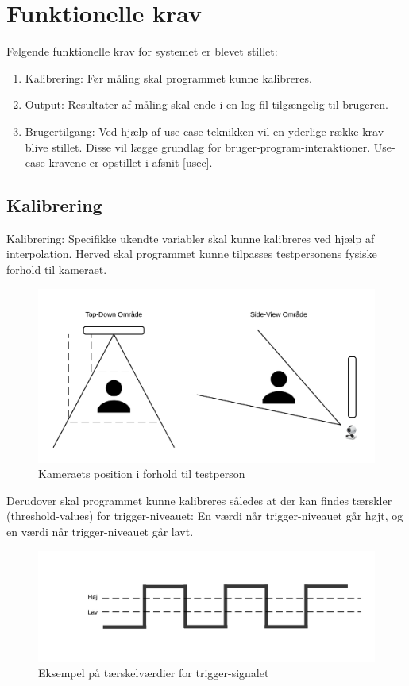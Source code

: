 \documentclass[kravspec.tex]{subfiles}
\begin{document}
\section{Funktionelle krav}
Følgende funktionelle krav for systemet er blevet stillet: \\
\begin{enumerate}
	\item 
	Kalibrering: Før måling skal programmet kunne kalibreres.
	\item
	Output: Resultater af måling skal ende i en log-fil tilgængelig til brugeren.
	\item
	Brugertilgang: Ved hjælp af use case teknikken vil en yderlige række krav blive stillet. Disse vil lægge grundlag for bruger-program-interaktioner. Use-case-kravene er opstillet i afsnit \ref{usec}.  
\end{enumerate}

\subsection{Kalibrering}
Kalibrering: Specifikke ukendte variabler skal kunne kalibreres ved hjælp af interpolation. Herved skal programmet kunne tilpasses testpersonens fysiske forhold til kameraet. 
\begin{figure}[h]
\centering
\includegraphics[width=0.7\linewidth]{../Kamera-testperson}
\caption{Kameraets position i forhold til testperson}
\label{fig:Camposition}
\end{figure}


Derudover skal programmet kunne kalibreres således at der kan findes tærskler (threshold-values) for trigger-niveauet: En værdi når trigger-niveauet går højt, og en værdi når trigger-niveauet går lavt.

\begin{figure}[H]
\centering
\includegraphics[width=0.7\linewidth]{../Trigger-threshold}
\caption{Eksempel på tærskelværdier for trigger-signalet}
\label{fig:Trigger-threshold}
\end{figure}
\end{document}
